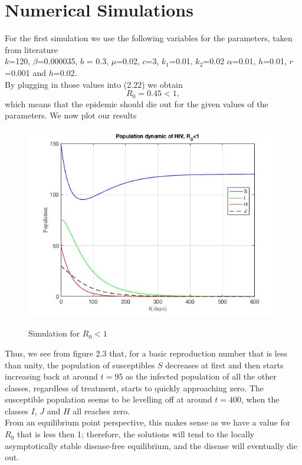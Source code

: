 \section{Numerical Simulations}
For the first simulation we use the following variables for the parameters, taken from literature
\\

$k$=120, $\beta$=0.000035, $b$ = 0.3, $\mu$=0.02, $c$=3, $k_{1}$=0.01, $k_{2}$=0.02 $\alpha$=0.01, $h$=0.01, $r$=0.001 and $h$=0.02.\\

By plugging in those values into (2.22) we obtain
$$
R_{0} = 0.45 < 1,
$$
which means that the epidemic should die out for the given values of the parameters. We now plot our results

\begin{figure}[H]
	{\includegraphics[scale=0.7]{hiv_art.jpg}}
	\caption{Simulation for $R_{0} < 1$}
\end{figure}

Thus, we see from figure 2.3 that, for a basic reproduction number that is less than unity, the population of susceptibles $S$ decreases at first and then starts increasing back at around $t=95$ as the infected population of all the other classes, regardless of treatment, starts to quickly approaching zero. The susceptible population seems to be levelling off at around $t=400$, when the classes $I$, $J$ and $H$ all reaches zero.\\
From an equilibrium point perspective, this makes sense as we have a value for $R_{0}$ that is less then 1; therefore, the solutions will tend to the locally asymptotically stable disease-free equilibrium, and the disease will eventually die out.\\

